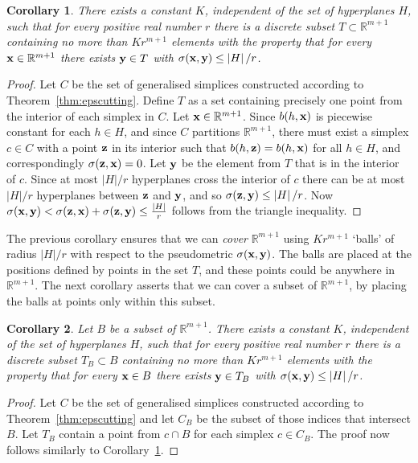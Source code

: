 \documentclass[aap]{imsart}
\newcommand{\reals}{{\mathbb R}}
\newcommand{\abs}[1]{\left\vert #1 \right\vert}
\newtheorem{corollary}{Corollary}
\begin{document}
\begin{corollary}\label{cor:epscutting}
There exists a constant $K$, independent of the set of hyperplanes $H$, such that for every positive real number $r$ there is a discrete subset $T \subset \reals^{m+1}$ containing no more than $K r^{m+1}$ elements with the property that for every $\xbf \in \reals^{m+1}$ there exists $\mathbf{y} \in T$ with $\sigma(\xbf, \ybf) \leq \abs{H}/r$.
\end{corollary}
\begin{proof}
Let $C$ be the set of generalised simplices constructed according to Theorem~\ref{thm:epscutting}.  Define $T$ as a set containing precisely one point from the interior of each simplex in $C$.  Let $\xbf \in \reals^{m+1}$.  Since $b(h, \mathbf{x})$ is piecewise constant for each $h \in H$, and since $C$ partitions $\reals^{m+1}$, there must exist a simplex $c \in C$ with a point $\mathbf{z}$ in its interior such that $b(h,\mathbf{z}) = b(h, \mathbf{x})$ for all $h \in H$, and correspondingly $\sigma(\mathbf{z}, \mathbf{x}) = 0$.  Let $\mathbf{y}$ be the element from $T$ that is in the interior of $c$.  Since at most $\abs{H}/r$ hyperplanes cross the interior of $c$ there can be at most $\abs{H}/r$ hyperplanes between $\mathbf{z}$ and $\mathbf{y}$, and so $\sigma(\zbf, \ybf) \leq \abs{H}/r$.  Now $\sigma(\xbf, \ybf) < \sigma(\zbf, \xbf) + \sigma(\zbf, \ybf) \leq \frac{\abs{H}}{r}$ follows from the triangle inequality.
\end{proof}

The previous corollary ensures that we can \emph{cover} $\reals^{m+1}$ using $K r^{m+1}$ `balls' of radius $\abs{H}/r$ with respect to the pseudometric $\sigma(\mathbf{x}, \mathbf{y})$.  The balls are placed at the positions defined by points in the set $T$, and these points could be anywhere in $\reals^{m+1}$.  The next corollary asserts that we can cover a subset of $\reals^{m+1}$, by placing the balls at points only within this subset.

\begin{corollary}\label{cor:epscuttingsubset}
Let $B$ be a subset of $\reals^{m+1}$.  There exists a constant $K$, independent of the set of hyperplanes $H$, such that for every positive real number $r$ there is a discrete subset $T_B \subset B$ containing no more than $K r^{m+1}$ elements with the property that for every $\mathbf{x} \in B$ there exists $\mathbf{y} \in T_B$ with $\sigma(\xbf, \ybf) \leq \abs{H}/r$.
\end{corollary}
\begin{proof}
Let $C$ be the set of generalised simplices constructed according to Theorem~\ref{thm:epscutting} and let $C_B$ be the subset of those indices that intersect $B$.  Let $T_B$ contain a point from $c \cap B$ for each simplex $c \in C_B$.  The proof now follows similarly to Corollary~\ref{cor:epscutting}.
\end{proof}
\end{document}
